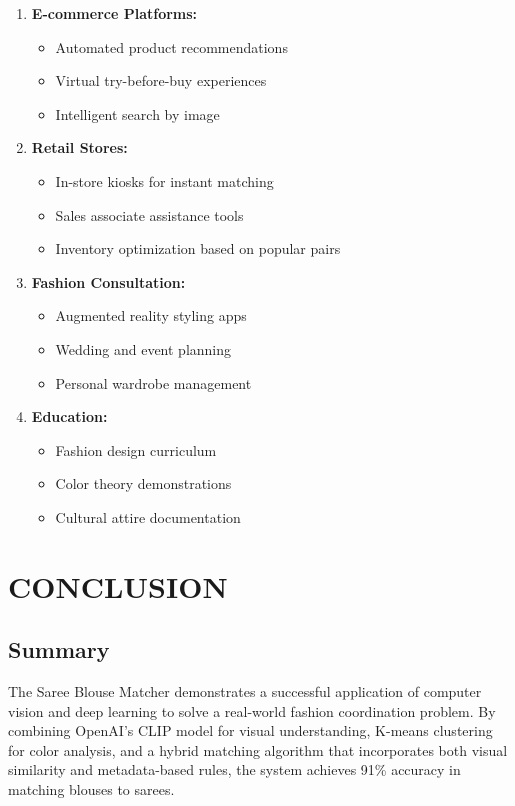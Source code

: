\documentclass[12pt,a4paper]{report}
\begin{document}
\begin{enumerate}
    \item \textbf{E-commerce Platforms:}
    \begin{itemize}
        \item Automated product recommendations
        \item Virtual try-before-buy experiences
        \item Intelligent search by image
    \end{itemize}
    
    \item \textbf{Retail Stores:}
    \begin{itemize}
        \item In-store kiosks for instant matching
        \item Sales associate assistance tools
        \item Inventory optimization based on popular pairs
    \end{itemize}
    
    \item \textbf{Fashion Consultation:}
    \begin{itemize}
        \item Augmented reality styling apps
        \item Wedding and event planning
        \item Personal wardrobe management
    \end{itemize}
    
    \item \textbf{Education:}
    \begin{itemize}
        \item Fashion design curriculum
        \item Color theory demonstrations
        \item Cultural attire documentation
    \end{itemize}
\end{enumerate}

\chapter{CONCLUSION}

\section{Summary}

The Saree Blouse Matcher demonstrates a successful application of computer vision and deep learning to solve a real-world fashion coordination problem. By combining OpenAI's CLIP model for visual understanding, K-means clustering for color analysis, and a hybrid matching algorithm that incorporates both visual similarity and metadata-based rules, the system achieves 91\% accuracy in matching blouses to sarees.
\end{document}
